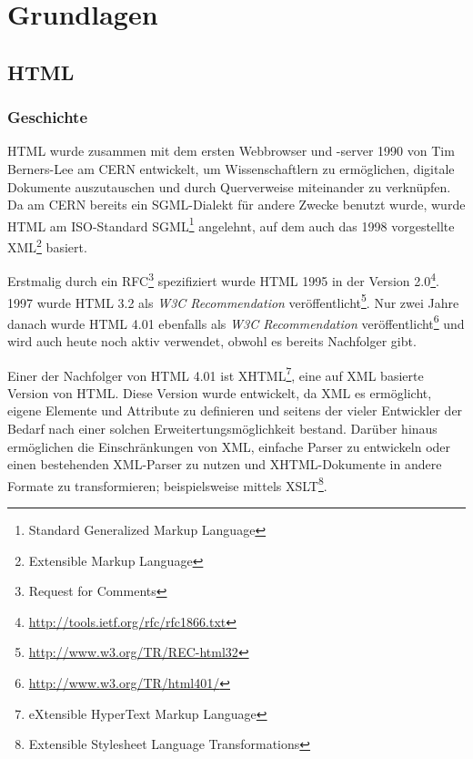 \chapter{Grundlagen}

\section{HTML}

\subsection{Geschichte}
HTML wurde zusammen mit dem ersten Webbrowser und -server 1990 von Tim Berners-Lee am CERN
entwickelt, um Wissenschaftlern zu ermöglichen, digitale Dokumente auszutauschen und durch
Querverweise miteinander zu verknüpfen. Da am CERN bereits ein SGML-Dialekt für andere Zwecke
benutzt wurde, wurde HTML am ISO-Standard SGML\footnote{Standard Generalized Markup Language}
angelehnt, auf dem auch das 1998 vorgestellte XML\footnote{Extensible Markup Language} basiert.

Erstmalig durch ein RFC\footnote{Request for Comments} spezifiziert wurde HTML 1995 in der Version
2.0\footnote{\href{http://tools.ietf.org/rfc/rfc1866.txt}{http://tools.ietf.org/rfc/rfc1866.txt}}.
1997 wurde HTML 3.2 als \emph{W3C Recommendation}
veröffentlicht\footnote{\href{http://www.w3.org/TR/REC-html32}{http://www.w3.org/TR/REC-html32}}.
Nur zwei Jahre danach wurde HTML 4.01 ebenfalls als \emph{W3C Recommendation}
veröffentlicht\footnote{\href{http://www.w3.org/TR/html401/}{http://www.w3.org/TR/html401/}} und
wird auch heute noch aktiv verwendet, obwohl es bereits Nachfolger gibt.

Einer der Nachfolger von HTML 4.01 ist XHTML\footnote{eXtensible HyperText Markup Language}, eine
auf XML basierte Version von HTML. Diese Version wurde entwickelt, da XML es ermöglicht, eigene
Elemente und Attribute zu definieren und seitens der vieler Entwickler der Bedarf nach einer solchen
Erweitertungsmöglichkeit bestand. Darüber hinaus ermöglichen die Einschränkungen von XML, einfache
Parser zu entwickeln oder einen bestehenden XML-Parser zu nutzen und XHTML-Dokumente in andere
Formate zu transformieren; beispielsweise mittels XSLT\footnote{Extensible Stylesheet Language
Transformations}. \citep{w3c:xhtml}

